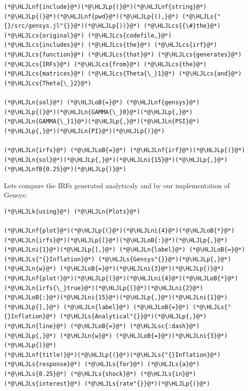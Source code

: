 \documentclass[12pt,a4paper]{article}
\newcommand{\HLJLk}[1]{\textcolor[RGB]{148,91,176}{\textbf{#1}}}
\newcommand{\HLJLn}[1]{#1}
\newcommand{\HLJLnf}[1]{\textcolor[RGB]{66,102,213}{#1}}
\newcommand{\HLJLs}[1]{\textcolor[RGB]{201,61,57}{#1}}
\newcommand{\HLJLsc}[1]{\textcolor[RGB]{201,61,57}{#1}}
\newcommand{\HLJLnfB}[1]{\textcolor[RGB]{59,151,46}{#1}}
\newcommand{\HLJLni}[1]{\textcolor[RGB]{59,151,46}{#1}}
\newcommand{\HLJLoB}[1]{\textcolor[RGB]{102,102,102}{\textbf{#1}}}
\newcommand{\HLJLp}[1]{#1}
\newcommand{\HLJLcs}[1]{\textcolor[RGB]{153,153,119}{\textit{#1}}}
\begin{document}
\begin{lstlisting}
(*@\HLJLnf{include}@*)(*@\HLJLp{(}@*)(*@\HLJLnf{string}@*)(*@\HLJLp{(}@*)(*@\HLJLnf{pwd}@*)(*@\HLJLp{(),}@*) (*@\HLJLs{"{}/src/gensys.jl"{}}@*)(*@\HLJLp{))}@*) (*@\HLJLcs{{\#}the}@*) (*@\HLJLcs{original}@*) (*@\HLJLcs{codefile,}@*) (*@\HLJLcs{includes}@*) (*@\HLJLcs{the}@*) (*@\HLJLcs{irf}@*) (*@\HLJLcs{function}@*) (*@\HLJLcs{that}@*) (*@\HLJLcs{generates}@*) (*@\HLJLcs{IRFs}@*) (*@\HLJLcs{from}@*) (*@\HLJLcs{the}@*) (*@\HLJLcs{matrices}@*) (*@\HLJLcs{Theta{\_}1}@*) (*@\HLJLcs{and}@*) (*@\HLJLcs{Theta{\_}2}@*)

(*@\HLJLn{sol}@*) (*@\HLJLoB{=}@*) (*@\HLJLnf{gensys}@*)(*@\HLJLp{(}@*)(*@\HLJLn{GAMMA{\_}0}@*)(*@\HLJLp{,}@*)(*@\HLJLn{GAMMA{\_}1}@*)(*@\HLJLp{,}@*)(*@\HLJLn{PSI}@*)(*@\HLJLp{,}@*)(*@\HLJLn{PI}@*)(*@\HLJLp{)}@*)

(*@\HLJLn{irfs}@*) (*@\HLJLoB{=}@*) (*@\HLJLnf{irf}@*)(*@\HLJLp{(}@*)(*@\HLJLn{sol}@*)(*@\HLJLp{,}@*)(*@\HLJLni{15}@*)(*@\HLJLp{,}@*)(*@\HLJLnfB{0.25}@*)(*@\HLJLp{)}@*)
\end{lstlisting}


Lets compare the IRFs generated analyticaly and by our implementation of Gensys:


\begin{lstlisting}
(*@\HLJLk{using}@*) (*@\HLJLn{Plots}@*)

(*@\HLJLnf{plot}@*)(*@\HLJLp{(}@*)(*@\HLJLni{4}@*)(*@\HLJLoB{*}@*)(*@\HLJLn{irfs}@*)(*@\HLJLp{[}@*)(*@\HLJLoB{:}@*)(*@\HLJLp{,}@*)(*@\HLJLni{1}@*)(*@\HLJLp{],}@*) (*@\HLJLn{label}@*) (*@\HLJLoB{=}@*) (*@\HLJLs{"{}Inflation}@*) (*@\HLJLs{Gensys"{}}@*)(*@\HLJLp{,}@*) (*@\HLJLn{w}@*) (*@\HLJLoB{=}@*)(*@\HLJLni{3}@*)(*@\HLJLp{)}@*)
(*@\HLJLnf{plot!}@*)(*@\HLJLp{(}@*)(*@\HLJLni{4}@*)(*@\HLJLoB{*}@*)(*@\HLJLn{irfs{\_}true}@*)(*@\HLJLp{[}@*)(*@\HLJLni{2}@*)(*@\HLJLoB{:}@*)(*@\HLJLni{15}@*)(*@\HLJLp{,}@*)(*@\HLJLni{1}@*)(*@\HLJLp{],}@*) (*@\HLJLn{label}@*) (*@\HLJLoB{=}@*) (*@\HLJLs{"{}Inflation}@*) (*@\HLJLs{Analytical"{}}@*)(*@\HLJLp{,}@*) (*@\HLJLn{line}@*) (*@\HLJLoB{=}@*) (*@\HLJLsc{:dash}@*)(*@\HLJLp{,}@*) (*@\HLJLn{w}@*) (*@\HLJLoB{=}@*)(*@\HLJLni{3}@*)(*@\HLJLp{)}@*)
(*@\HLJLnf{title!}@*)(*@\HLJLp{(}@*)(*@\HLJLs{"{}Inflation}@*) (*@\HLJLs{response}@*) (*@\HLJLs{for}@*) (*@\HLJLs{a}@*) (*@\HLJLs{0.25}@*) (*@\HLJLs{shock}@*) (*@\HLJLs{in}@*) (*@\HLJLs{interest}@*) (*@\HLJLs{rate"{}}@*)(*@\HLJLp{)}@*)
\end{lstlisting}
\end{document}

